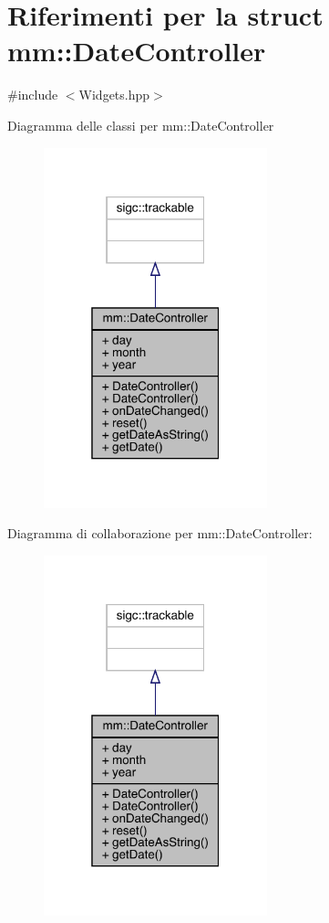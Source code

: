 \hypertarget{structmm_1_1_date_controller}{}\section{Riferimenti per la struct mm\+:\+:Date\+Controller}
\label{structmm_1_1_date_controller}


{\ttfamily \#include $<$Widgets.\+hpp$>$}



Diagramma delle classi per mm\+:\+:Date\+Controller\nopagebreak
\begin{figure}[H]
\begin{center}
\leavevmode
\includegraphics[width=184pt]{db/db8/structmm_1_1_date_controller__inherit__graph}
\end{center}
\end{figure}


Diagramma di collaborazione per mm\+:\+:Date\+Controller\+:\nopagebreak
\begin{figure}[H]
\begin{center}
\leavevmode
\includegraphics[width=184pt]{d0/d40/structmm_1_1_date_controller__coll__graph}
\end{center}
\end{figure}
